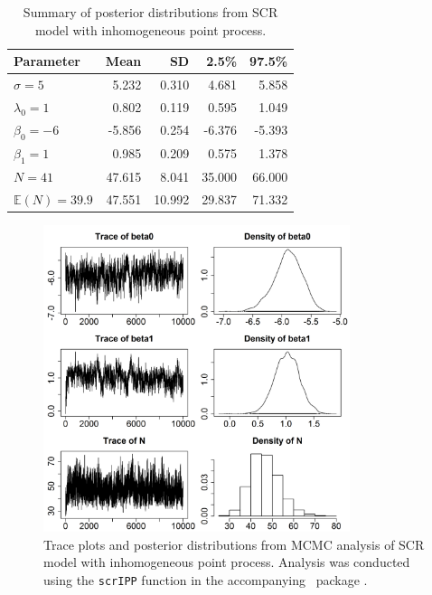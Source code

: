 \begin{table}[h!]
\centering
\caption{Summary of posterior distributions from SCR model with
  inhomogeneous point process. }
\begin{tabular}{lrrrr}
\hline
Parameter 	 	& Mean  	& SD    	& 2.5\% 	& 97.5\% \\
\hline
 $\sigma=5$ 	 	&  5.232 	&  0.310 	&  4.681 	&  5.858 \\
 $\lambda_0=1$ 	 	&  0.802 	&  0.119 	&  0.595 	&  1.049 \\
 $\beta_0=-6$ 	 	& -5.856        & 0.254        & -6.376        & -5.393 \\
 $\beta_1=1$ 	 	&  0.985 	&  0.209 	&  0.575 	&  1.378 \\
 $N=41$ 	 	& 47.615 	&  8.041 	& 35.000 	& 66.000 \\
 $\mathbb{E}(N)=39.9$ 	& 47.551 	& 10.992 	& 29.837 	& 71.332 \\
\hline
\end{tabular}
\label{state-space.tab.simIPP}
\end{table}

\begin{figure}[h!]
  \centering
  \includegraphics[width=0.8\textwidth]{Ch11-Statespace/figs/fm1p}
  \caption{Trace plots and posterior distributions from MCMC analysis
    of SCR model with inhomogeneous point process. Analysis was
    conducted using the \texttt{scrIPP} function in the accompanying
    \R~package \scrbook.}
  \label{state-space.fig.fm1post}
\end{figure}



